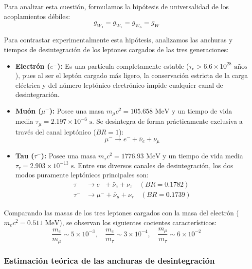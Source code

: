 Para analizar esta cuestión, formulamos la hipótesis de universalidad de los acoplamientos débiles:
\begin{equation}
    g_{W_1} = g_{W_2} = g_{W_3} = g_W
\end{equation}

Para contrastar experimentalmente esta hipótesis, analizamos las anchuras y tiempos de desintegración de los leptones cargados de las tres generaciones:
\begin{itemize}
    \item \textbf{Electrón ($e^-$):} Es una partícula completamente estable ($\tau_e > 6.6 \times 10^{28}\text{ años}$), pues al ser el leptón cargado más ligero, la conservación estricta de la carga eléctrica y del número leptónico electrónico impide cualquier canal de desintegración.
    \item \textbf{Muón ($\mu^-$):} Posee una masa $m_\mu c^2 = 105.658\text{ MeV}$ y un tiempo de vida media $\tau_\mu = 2.197 \times 10^{-6}\text{ s}$. Se desintegra de forma prácticamente exclusiva a través del canal leptónico ($BR = 1$):
    \begin{equation}
        \mu^- \to e^- + \bar{\nu}_e + \nu_\mu
    \end{equation}
    \item \textbf{Tau ($\tau^-$):} Posee una masa $m_\tau c^2 = 1776.93\text{ MeV}$ y un tiempo de vida media $\tau_\tau = 2.903 \times 10^{-13}\text{ s}$. Entre sus diversos canales de desintegración, los dos modos puramente leptónicos principales son:
    \begin{align}
        \tau^- &\to e^- + \bar{\nu}_e + \nu_\tau \quad (BR = 0.1782) \\
        \tau^- &\to \mu^- + \bar{\nu}_\mu + \nu_\tau \quad (BR = 0.1739)
    \end{align}
\end{itemize}

Comparando las masas de los tres leptones cargados con la masa del electrón ($m_e c^2 = 0.511\text{ MeV}$), se observan los siguientes cocientes característicos:
\begin{equation}
    \frac{m_e}{m_\mu} \sim 5 \times 10^{-3}, \quad \frac{m_e}{m_\tau} \sim 3 \times 10^{-4}, \quad \frac{m_\mu}{m_\tau} \sim 6 \times 10^{-2}
\end{equation}

\subsubsection{Estimación teórica de las anchuras de desintegración}

